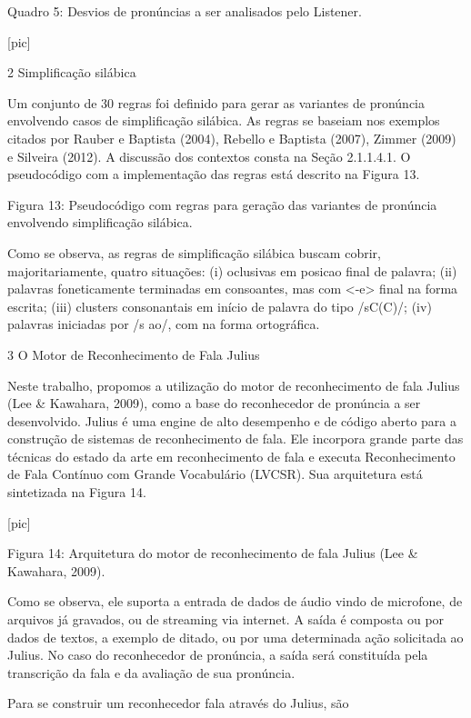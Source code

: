 Quadro 5: Desvios de pron\'uncias a ser analisados pelo Listener.

 [pic]

2 Simplifica\c{c}\~ao sil\'abica

Um conjunto de 30 regras foi definido para gerar as variantes de
pron\'uncia envolvendo casos de simplifica\c{c}\~ao sil\'abica. As regras se
baseiam nos exemplos citados por Rauber e Baptista (2004), Rebello e
Baptista (2007), Zimmer (2009) e Silveira (2012). A discuss\~ao dos
contextos consta na Se\c{c}\~ao 2.1.1.4.1. O pseudoc\'odigo com a implementa\c{c}\~ao
das regras est\'a descrito na Figura 13.

Figura 13: Pseudoc\'odigo com regras para gera\c{c}\~ao das variantes de
pron\'uncia envolvendo simplifica\c{c}\~ao sil\'abica.

Como se observa, as regras de simplifica\c{c}\~ao sil\'abica buscam cobrir,
majoritariamente, quatro situa\c{c}\~oes: (i) oclusivas em posicao final de
palavra; (ii) palavras foneticamente terminadas em consoantes, mas com
\textless{}-e\textgreater{} final na forma escrita; (iii) clusters
consonantais em in\'icio de palavra do tipo /sC(C)/; (iv) palavras
iniciadas por /s ao/, com na forma ortogr\'afica.

3 O Motor de Reconhecimento de Fala Julius

Neste trabalho, propomos a utiliza\c{c}\~ao do motor de reconhecimento de fala
Julius (Lee \& Kawahara, 2009), como a base do reconhecedor de pron\'uncia
a ser desenvolvido. Julius \'e uma engine de alto desempenho e de c\'odigo
aberto para a constru\c{c}\~ao de sistemas de reconhecimento de fala. Ele
incorpora grande parte das t\'ecnicas do estado da arte em reconhecimento
de fala e executa Reconhecimento de Fala Cont\'inuo com Grande Vocabul\'ario
(LVCSR). Sua arquitetura est\'a sintetizada na Figura 14.

 [pic]

Figura 14: Arquitetura do motor de reconhecimento de fala Julius (Lee \&
Kawahara, 2009).

Como se observa, ele suporta a entrada de dados de \'audio vindo de
microfone, de arquivos j\'a gravados, ou de streaming via internet. A
sa\'ida \'e composta ou por dados de textos, a exemplo de ditado, ou por uma
determinada a\c{c}\~ao solicitada ao Julius. No caso do reconhecedor de
pron\'uncia, a sa\'ida ser\'a constitu\'ida pela transcri\c{c}\~ao da fala e da
avalia\c{c}\~ao de sua pron\'uncia.

 Para se construir um reconhecedor fala atrav\'es do Julius, s\~ao

